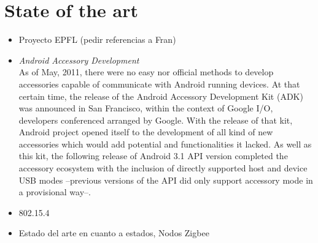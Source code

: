 	\section{State of the art}
		\begin{itemize}
			\item Proyecto EPFL (pedir referencias a Fran)
			\item \emph{Android Accessory Development}\\
				As of May, 2011, there were no easy nor official methods to develop
				accessories capable of communicate with Android running devices. At that
				certain time, the release of the Android Accessory Development Kit (ADK)
				was announced in San Francisco, within the context of Google I/O, developers
				conferenced arranged by Google.
				With the release of that kit, Android project opened itself to the development
				of all kind of new accessories which would add potential and functionalities
				it lacked.
				As well as this kit, the following release of Android 3.1 API version completed
				the accessory ecosystem with the inclusion of directly supported host and device
				USB modes --previous versions of the API did only support accessory mode in a 
				provisional way--.
			\item 802.15.4
			\item Estado del arte en cuanto a estados, Nodos Zigbee
		\end{itemize}
